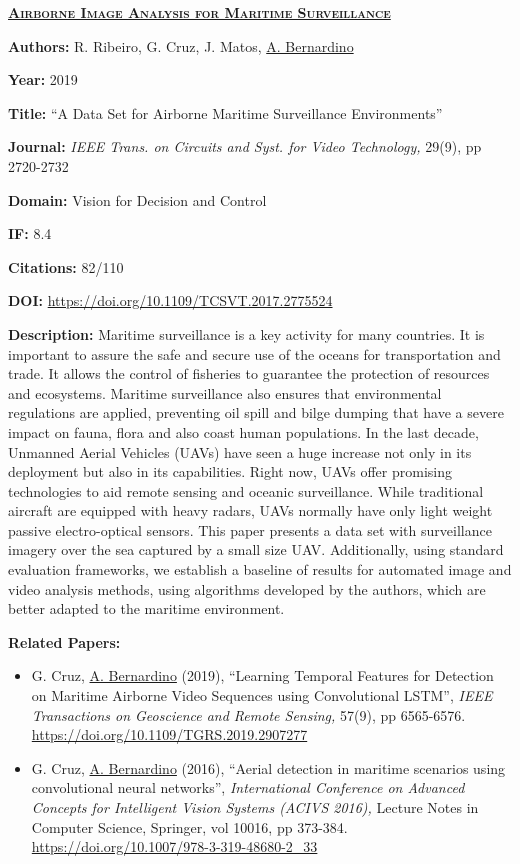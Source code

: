 \clearpage

\textbf{\textsc{\ul{Airborne Image Analysis for Maritime Surveillance}}}

\textbf{Authors:} R. Ribeiro, G. Cruz, J. Matos, \ul{A. Bernardino}

\textbf{Year:} 2019

\textbf{Title:} ``A Data Set for Airborne Maritime Surveillance
Environments''

\textbf{Journal:} \emph{IEEE Trans. on Circuits and Syst. for Video
Technology,} 29(9), pp 2720-2732

\textbf{Domain:} Vision for Decision and Control

\textbf{IF:} 8.4

\textbf{Citations:} 82/110

\textbf{DOI:} \url{https://doi.org/10.1109/TCSVT.2017.2775524}~~

\textbf{Description:} Maritime surveillance is a key activity for many
countries. It is important to assure the safe and secure use of the
oceans for transportation and trade. It allows the control of fisheries
to guarantee the protection of resources and ecosystems. Maritime
surveillance also ensures that environmental regulations are applied,
preventing oil spill and bilge dumping that have a severe impact on
fauna, flora and also coast human populations. In the last decade,
Unmanned Aerial Vehicles (UAVs) have seen a huge increase not only in
its deployment but also in its capabilities. Right now, UAVs offer
promising technologies to aid remote sensing and oceanic surveillance.
While traditional aircraft are equipped with heavy radars, UAVs normally
have only light weight passive electro-optical sensors. This paper
presents a data set with surveillance imagery over the sea captured by a
small size UAV. Additionally, using standard evaluation frameworks, we
establish a baseline of results for automated image and video analysis
methods, using algorithms developed by the authors, which are better
adapted to the maritime environment.

\textbf{Related Papers:}

\begin{itemize}
\item
  G. Cruz, \ul{A. Bernardino} (2019), ``Learning Temporal Features for
  Detection on Maritime Airborne Video Sequences using Convolutional
  LSTM'', \emph{IEEE Transactions on Geoscience and Remote Sensing,}
  57(9), pp 6565-6576.
  \url{https://doi.org/10.1109/TGRS.2019.2907277}~~~
\item
  G. Cruz, \ul{A. Bernardino} (2016), ``Aerial detection in maritime
  scenarios using convolutional neural networks'', \emph{International
  Conference on Advanced Concepts for Intelligent Vision Systems (ACIVS
  2016),} Lecture Notes in Computer Science, Springer, vol 10016, pp
  373-384. \url{https://doi.org/10.1007/978-3-319-48680-2_33}
\end{itemize}

